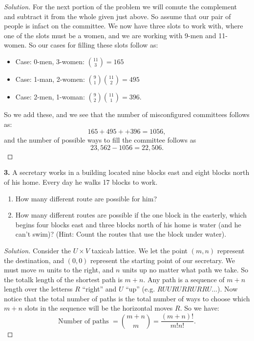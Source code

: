 \documentclass[12pt]{amsart}
\newenvironment{solution}
{\begin{proof}[Solution]}
{\end{proof}}
\begin{document}
\begin{onehalfspace}
\begin{solution}
            For the next portion of the problem we will comute the complement and subtract it from the whole given just
            above. So assume that our pair of people is infact on the committee. We now have three slots to work with,
            where one of the slots must be a women, and we are working with 9-men and 11-women. So our cases for filling
            these slots follow as:
            \begin{itemize}
                \item Case: 0-men, 3-women: $\binom{11}{3} = 165$
                \item Case: 1-man, 2-women: $\binom{9}{1}\binom{11}{2} = 495$
                \item Case: 2-men, 1-woman: $\binom{9}{2}\binom{11}{1} = 396$.
            \end{itemize}
            So we add these, and we see that the number of misconfigured committees follows as:
            \begin{displaymath}
                165 + 495 + + 396 = 1056,
            \end{displaymath}
            and the number of possible ways to fill the committee follows as
            \begin{displaymath}
                23,562 - 1056 = 22,506.
            \end{displaymath}

        \end{solution}

        \textbf{3.} A secretary works in a building located nine blocks east and
        eight blocks north of his home. Every day he walks 17 blocks to work.
        \begin{enumerate}[label=(\alph*)]
            \item How many different route are possible for him?
            \item How many different routes are possible if the one block in the easterly,
                  which begins four blocks east and three blocks north of his home is water
                  (and he can't swim)? (Hint: Count the routes that use the block under water).
        \end{enumerate}
        \begin{solution}
            Consider the $U\times V$ taxicab lattice. We let the point $(m,n)$ represent the destination, and $(0,0)$
            represent the starting point of our secretary. We must move $m$ units to the right, and $n$ units up no
            matter what path we take. So the totalk length of the shortest path is $m+n$. Any path is a sequence of $m+n$
            length over the letterss $R$ ``right'' and $U$ ``up'' (e.g. $RUURURRURRU\ldots$). Now notice that the total
            number of paths is the total number of ways to choose which $m+n$ slots in the sequence will be the horizontal
            moves $R$. So we have:
            \begin{displaymath}
                \text{Number of paths } = \binom{m + n}{m} = \frac{(m+n)!}{m!n!}.
            \end{displaymath}


\end{solution}
\end{onehalfspace}
\end{document}
